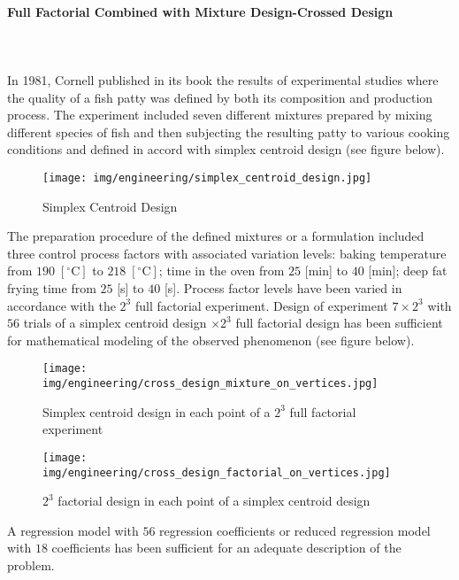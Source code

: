 	\paragraph{Full Factorial Combined with Mixture Design-Crossed Design}\mbox{}\\\\
	In 1981, Cornell\cite{cornell2011experiments} published in its book the results of experimental studies where the quality of a fish patty was defined by both its composition and production process. The experiment included seven different mixtures prepared by mixing different species of fish and then subjecting the resulting patty to various cooking conditions and defined in accord with simplex centroid design (see figure below).
	\begin{figure}[H]
		\centering
		\texttt{[image: img/engineering/simplex\_centroid\_design.jpg]}
		\caption{Simplex Centroid Design}
	\end{figure}
	The preparation procedure of the defined mixtures or a formulation included three control process factors with associated
variation levels: baking temperature from $190\;[^\circ\text{C}]$  to $218\;[^\circ\text{C}]$; time in the oven from $25$ [min] to $40$ [min]; deep fat frying time from $25$ [s] to $40$ [s]. Process factor levels have been varied in accordance with the $2^3$ full factorial experiment. Design of experiment $7\times 2^3$ with $56$ trials of a simplex centroid design $\times 2^3$ full factorial design
has been sufficient for mathematical modeling of the observed phenomenon (see figure below).
	\begin{figure}[H]
		\centering
		\texttt{[image: img/engineering/cross\_design\_mixture\_on\_vertices.jpg]}
		\caption{Simplex centroid design in each point of a $2^3$ full factorial experiment}
	\end{figure}
	\begin{figure}[H]
		\centering
		\texttt{[image: img/engineering/cross\_design\_factorial\_on\_vertices.jpg]}
		\caption{$2^3$ factorial design in each point of a simplex centroid design}
	\end{figure}
	A regression model with $56$ regression coefficients or reduced regression model with $18$ coefficients has been sufficient for an adequate description of the
problem.	
	
